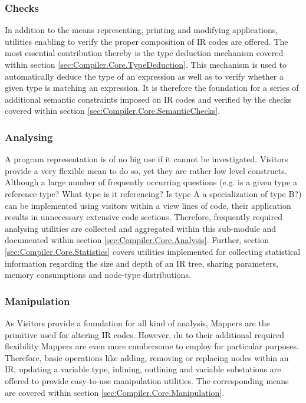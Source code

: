 \subsubsection{Checks}
In addition to the means representing, printing and modifying applications,
utilities enabling to verify the proper composition of IR codes are offered. The
most essential contribution thereby is the type deduction mechanism covered
within section \ref{sec:Compiler.Core.TypeDeduction}. This mechanism is used
to automatically deduce the type of an expression as well as to verify whether a
given type is matching an expression. It is therefore the foundation for a
series of additional semantic constraints imposed on IR codes and verified by
the checks covered within section \ref{sec:Compiler.Core.SemanticChecks}. 

\subsubsection{Analysing}
A program representation is of no big use if it cannot be investigated. Visitors
provide a very flexible mean to do so, yet they are rather low level constructs.
Although a large number of frequently occurring questions (e.g. is a given type
a reference type? What type is it referencing? Is type A a specialization of
type B?) can be implemented using visitors within a view lines of code, their
application results in unnecessary extensive code sections. Therefore,
frequently required analysing utilities are collected and aggregated within this
sub-module and documented within section \ref{sec:Compiler.Core.Analysis}.
Further, section \ref{sec:Compiler.Core.Statistics} covers utilities implemented
for collecting statistical information regarding the size and depth of an IR
tree, sharing parameters, memory consumptions and node-type distributions.

\subsubsection{Manipulation}
As Visitors provide a foundation for all kind of analysis, Mappers are the
primitive used for altering IR codes. However, du to their additional required
flexibility Mappers are even more cumbersome to employ for particular purposes.
Therefore, basic operations like adding, removing or replacing nodes within an
IR, updating a variable type, inlining, outlining and variable substations are
offered to provide easy-to-use manipulation utilities. The corresponding means
are covered within section \ref{sec:Compiler.Core.Manipulation}.


